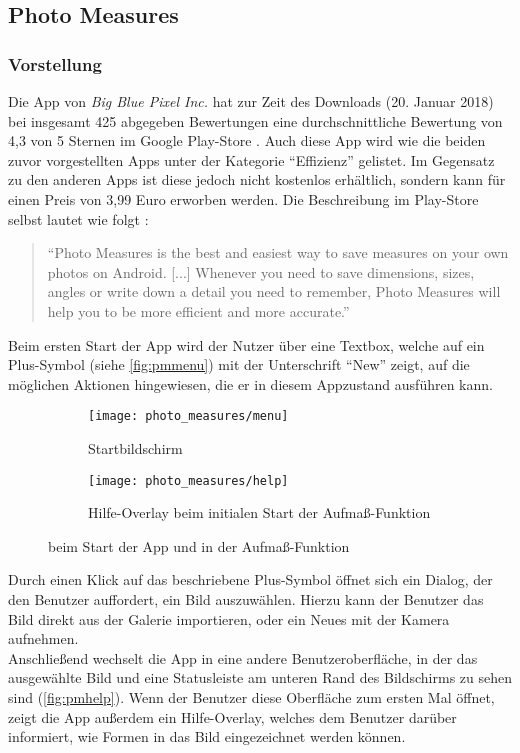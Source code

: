 \subsection{Photo Measures}

\subsubsection{Vorstellung}
Die App \pm{} von \emph{Big Blue Pixel Inc.} hat zur Zeit des Downloads (20. Januar 2018) bei insgesamt 425 abgegeben Bewertungen eine durchschnittliche Bewertung von 4,3 von 5 Sternen im Google Play-Store \citep{PixelPM}.
Auch diese App wird wie die beiden zuvor vorgestellten Apps unter der Kategorie ``Effizienz'' gelistet.
Im Gegensatz zu den anderen Apps ist diese jedoch nicht kostenlos erhältlich, sondern kann für einen Preis von 3,99 Euro erworben werden.  
Die Beschreibung im Play-Store selbst lautet wie folgt :

\begin{quote}
  ``Photo Measures is the best and easiest way to save measures on your own photos on Android.
  [...] Whenever you need to save dimensions, sizes, angles or write down a detail you need to remember, Photo Measures will help you to be more efficient and more accurate.''
\end{quote}

\noindent
Beim ersten Start der App wird der Nutzer über eine Textbox, welche auf ein Plus-Symbol (siehe \autoref{fig:pmmenu}) mit der Unterschrift ``New'' zeigt, auf die möglichen Aktionen hingewiesen, die er in diesem Appzustand ausführen kann.

\begin{figure}[h]
  \centering
	\begin{subfigure}[t]{0.4\textwidth}
		\texttt{[image: photo\_measures/menu]}
		\caption{Startbildschirm}
		\label{fig:pmmenu}	
	\end{subfigure}
	\begin{subfigure}[t]{0.4\textwidth}
		\texttt{[image: photo\_measures/help]}
		\caption{Hilfe-Overlay beim initialen Start der Aufmaß-Funktion} 
		\label{fig:pmhelp}	
	\end{subfigure}
  \caption{\pm{} beim Start der App und in der Aufmaß-Funktion}
\end{figure}

\noindent
Durch einen Klick auf das beschriebene Plus-Symbol öffnet sich ein Dialog, der den Benutzer auffordert, ein Bild auszuwählen.
Hierzu kann der Benutzer das Bild direkt aus der Galerie importieren, oder ein Neues mit der Kamera aufnehmen. \\
Anschließend wechselt die App in eine andere Benutzeroberfläche, in der das ausgewählte Bild und eine Statusleiste am unteren Rand des Bildschirms zu sehen sind (\autoref{fig:pmhelp}).
Wenn der Benutzer diese Oberfläche zum ersten Mal öffnet, zeigt die App außerdem ein Hilfe-Overlay, welches dem Benutzer darüber informiert, wie Formen in das Bild eingezeichnet werden können.  \\

